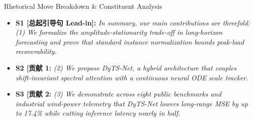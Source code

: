 \begin{TipBox}{Rhetorical Move Breakdown \& Constituent Analysis}
\begin{itemize}[leftmargin=1.5em]
  \item \textbf{S1 [总起引导句 Lead-in]:} \textit{In summary, our main contributions are threefold: (1) We formalize the amplitude-stationarity trade-off in long-horizon forecasting and prove that standard instance normalization bounds peak-load recoverability.}\par{}
  \item \textbf{S2 [贡献 1:} \textit{(2) We propose DyTS-Net, a hybrid architecture that couples shift-invariant spectral attention with a continuous neural ODE scale tracker.}\par{}
  \item \textbf{S3 [贡献 2:} \textit{(3) We demonstrate across eight public benchmarks and industrial wind-power telemetry that DyTS-Net lowers long-range MSE by up to 17.4\% while cutting inference latency nearly in half.}\par{}
\end{itemize}
\end{TipBox}
\medskip

